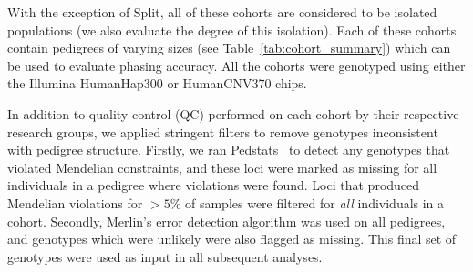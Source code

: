 With the exception of Split, all of these cohorts are considered to be isolated populations (we also evaluate the degree of this isolation).  Each of these cohorts contain pedigrees of varying sizes (see Table~\ref{tab:cohort_summary})  which can be used to evaluate phasing accuracy.   All the  cohorts were genotyped using either the Illumina HumanHap300 or HumanCNV370 chips. 

In addition to quality control (QC) performed on each cohort by their respective research groups, we applied stringent  filters to remove genotypes inconsistent with pedigree structure.  Firstly, we ran Pedstats~\citep{wigginton2005pedstats} to detect any genotypes that violated Mendelian constraints, and these loci were marked as missing for all individuals in a pedigree where violations were found. Loci that produced Mendelian violations for $>5\%$ of samples were filtered for \emph{all} individuals in a cohort.  Secondly, Merlin's error detection algorithm was used on all pedigrees, and genotypes which were unlikely were also flagged as missing.  This final set of genotypes were used as input in all subsequent analyses.


